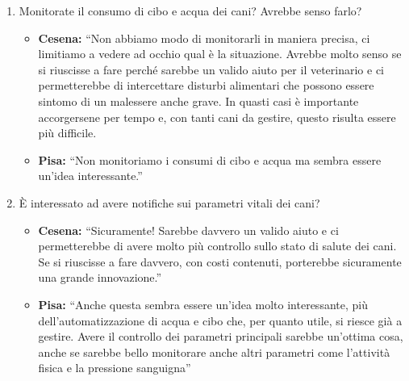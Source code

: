 \documentclass{report}
\begin{document}
\begin{enumerate}
  \begin{itemize}
  \tightlist
  \item
  \end{itemize}
\item
  Monitorate il consumo di cibo e acqua dei cani? Avrebbe senso farlo?

  \begin{itemize}
  \tightlist
  \item
    \textbf{Cesena:} ``Non abbiamo modo di monitorarli in maniera
    precisa, ci limitiamo a vedere ad occhio qual è la situazione.
    Avrebbe molto senso se si riuscisse a fare perché sarebbe un valido
    aiuto per il veterinario e ci permetterebbe di intercettare disturbi
    alimentari che possono essere sintomo di un malessere anche grave.
    In quasti casi è importante accorgersene per tempo e, con tanti cani
    da gestire, questo risulta essere più difficile.
  \item
    \textbf{Pisa: }``Non monitoriamo i consumi di cibo e acqua ma sembra
    essere un'idea interessante.''
  \end{itemize}
\item
  È interessato ad avere notifiche sui parametri vitali dei cani?

  \begin{itemize}
  \tightlist
  \item
    \textbf{Cesena:} ``Sicuramente! Sarebbe davvero un valido aiuto e ci
    permetterebbe di avere molto più controllo sullo stato di salute dei
    cani. Se si riuscisse a fare davvero, con costi contenuti,
    porterebbe sicuramente una grande innovazione.''
  \item
    \textbf{Pisa: }``Anche questa sembra essere un'idea molto
    interessante, più dell'automatizzazione di acqua e cibo che, per
    quanto utile, si riesce già a gestire. Avere il controllo dei
    parametri principali sarebbe un'ottima cosa, anche se sarebbe bello
    monitorare anche altri parametri come l'attività fisica e la
    pressione sanguigna''
  \end{itemize}
\end{enumerate}
\end{document}
